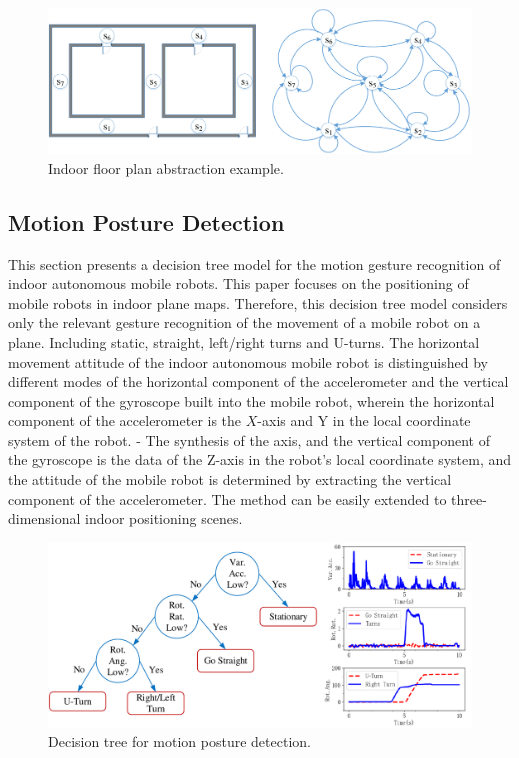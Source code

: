 \documentclass{llncs}
\begin{document}
\begin{figure}[!htbp]
	\centering
	\includegraphics[width=4.576in]{RobotMatch-MapAbstract}
	\caption{Indoor floor plan abstraction example.}
	\label{fig-abstract}
\end{figure}

\subsection{Motion Posture Detection}

This section presents a decision tree model for the motion gesture recognition of indoor autonomous mobile robots. This paper focuses on the positioning of mobile robots in indoor plane maps. Therefore, this decision tree model considers only the relevant gesture recognition of the movement of a mobile robot on a plane. Including static, straight, left/right turns and U-turns.
The horizontal movement attitude of the indoor autonomous mobile robot is distinguished by different modes of the horizontal component of the accelerometer and the vertical component of the gyroscope built into the mobile robot, wherein the horizontal component of the accelerometer is the $X$-axis and Y in the local coordinate system of the robot. - The synthesis of the axis, and the vertical component of the gyroscope is the data of the Z-axis in the robot's local coordinate system, and the attitude of the mobile robot is determined by extracting the vertical component of the accelerometer. The method can be easily extended to three-dimensional indoor positioning scenes.

\begin{figure}[!htbp]
	\centering
	\includegraphics[width=4.95in]{RobotMatch-ActivityDecision}
	\caption{Decision tree for motion posture detection.}
	\label{fig-posture}
\end{figure}
\end{document}
